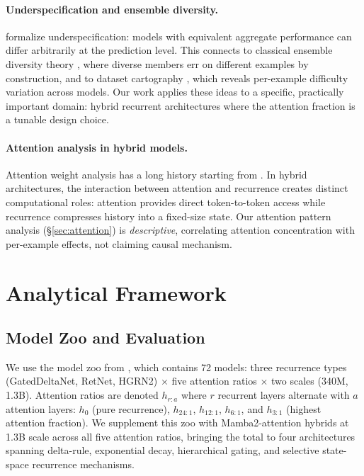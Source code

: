 \documentclass[11pt]{article}
\begin{document}
\paragraph{Underspecification and ensemble diversity.}
\citet{damour2022underspecification} formalize underspecification: models with equivalent aggregate performance can differ arbitrarily at the prediction level.
This connects to classical ensemble diversity theory \citep{krogh1995neural, kuncheva2003measures}, where diverse members err on different examples by construction, and to dataset cartography \citep{swayamdipta2020dataset, ethayarajh2022understanding}, which reveals per-example difficulty variation across models.
Our work applies these ideas to a specific, practically important domain: hybrid recurrent architectures where the attention fraction is a tunable design choice.

\paragraph{Attention analysis in hybrid models.}
Attention weight analysis has a long history starting from \citet{vaswani2017attention}.
In hybrid architectures, the interaction between attention and recurrence creates distinct computational roles: attention provides direct token-to-token access while recurrence compresses history into a fixed-size state.
Our attention pattern analysis (\S\ref{sec:attention}) is \textit{descriptive}, correlating attention concentration with per-example effects, not claiming causal mechanism.

\section{Analytical Framework}
\label{sec:framework}

\subsection{Model Zoo and Evaluation}

We use the model zoo from \citet{wang2025zoo}, which contains 72 models: three recurrence types (GatedDeltaNet, RetNet, HGRN2) $\times$ five attention ratios $\times$ two scales (340M, 1.3B).
Attention ratios are denoted $h_{r:a}$ where $r$ recurrent layers alternate with $a$ attention layers: $h_0$ (pure recurrence), $h_{24:1}$, $h_{12:1}$, $h_{6:1}$, and $h_{3:1}$ (highest attention fraction).
We supplement this zoo with Mamba2-attention hybrids \citep{dao2024mamba2} at 1.3B scale across all five attention ratios, bringing the total to four architectures spanning delta-rule, exponential decay, hierarchical gating, and selective state-space recurrence mechanisms.
\end{document}
